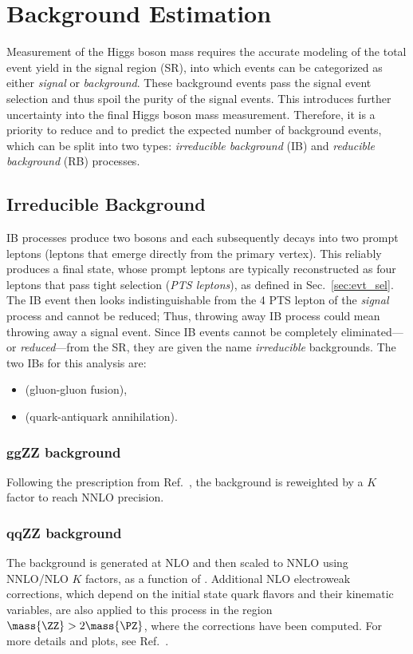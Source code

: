 \section{Background Estimation}
\label{sec:bkg_estim}
Measurement of the Higgs boson mass requires the accurate modeling of the total event yield in the signal region (SR), into which events can be categorized as either \emph{signal} or \emph{background}.
These background events pass the signal event selection
and thus spoil the purity of the signal events.
This introduces further uncertainty into the final Higgs boson mass measurement.
Therefore, it is a priority to reduce and to predict the expected number of background events, which can be split into two types: \emph{irreducible background} (IB) and \emph{reducible background} (RB) processes.

\subsection{Irreducible Background}
\label{sec:bkg_irred}
IB processes produce two \PZ bosons and each \PZ subsequently decays into two prompt leptons (leptons that emerge directly from the primary vertex).
This reliably produces a \fourl final state, whose prompt leptons are typically reconstructed as four leptons that pass tight selection (\emph{PTS leptons}), as defined in Sec.~\ref{sec:evt_sel}.
The IB event then looks indistinguishable from the 4 PTS lepton of the \emph{signal} process and cannot be reduced;
Thus, throwing away IB process could mean throwing away a signal event.
Since IB events cannot be completely eliminated---or \emph{reduced}---from the SR, they are given the name \emph{irreducible} backgrounds.
The two IBs for this analysis are:
\begin{itemize}
    \item \ggzzfourl (gluon-gluon fusion),
    \item \qqzzfourl (quark-antiquark annihilation).
\end{itemize}

\subsubsection{ggZZ background}
Following the prescription from Ref.~\cite{HIG_19_001}, the \ggzzfourl background is reweighted by a $K$ factor to reach NNLO precision.

\subsubsection{qqZZ background}
The \qqzzfourl background is generated at NLO and then scaled to NNLO using NNLO/NLO $K$ factors,
as a function of \mass{\ZZ}. Additional NLO electroweak corrections, which depend on the initial state quark flavors and their
kinematic variables, are also applied to this process in the region $\mass{\ZZ} > 2\mass{\PZ}$, where the corrections have been computed. 
For more details and plots, see Ref.~\cite{HIG_19_001}.

